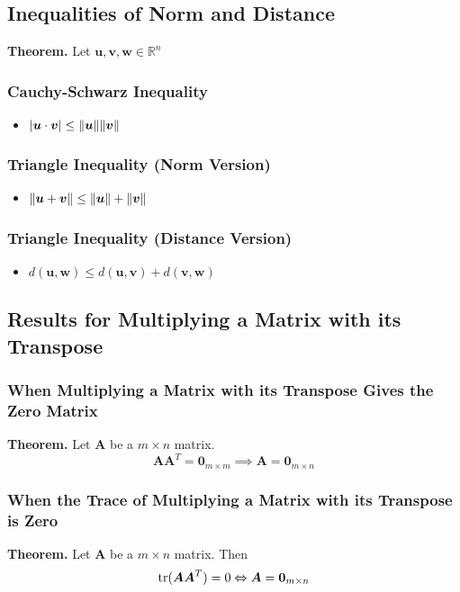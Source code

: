 \documentclass[../ma2001_notes.tex]{subfiles}
\begin{document}
\subsection{Inequalities of Norm and Distance}
\textbf{Theorem.} Let \(\bm{u},\bm{v},\bm{w}\in\mathbb{R}^n\)

\subsubsection{Cauchy-Schwarz Inequality}
\begin{itemize}
	\item\(\lvert\bm{u}\cdot\bm{v}\rvert\leq\lVert\bm{u}\rVert\lVert\bm{v}\rVert\)
\end{itemize}

\subsubsection{Triangle Inequality (Norm Version)}
\begin{itemize}
	\item\(\lVert\bm{u}+\bm{v}\rVert\leq\lVert\bm{u}\rVert+\lVert\bm{v}\rVert\)
\end{itemize}
\subsubsection{Triangle Inequality (Distance Version)}
\begin{itemize}
	\item\(d(\bm{u},\bm{w})\leq d(\bm{u},\bm{v})+d(\bm{v},\bm{w})\)
\end{itemize}

\subsection{Results for Multiplying a Matrix with its Transpose}
\subsubsection{When Multiplying a Matrix with its Transpose Gives the Zero Matrix}
\textbf{Theorem.} Let \(\bm{A}\) be a \(m\times n\) matrix.
\[\bm{AA}^T=\bm{0}_{m\times m}\implies\bm{A}=\bm{0}_{m\times n}\]

\subsubsection{When the Trace of Multiplying a Matrix with its Transpose is Zero}
\textbf{Theorem.} Let \(\bm{A}\) be a \(m\times n\) matrix. Then
\[\operatorname{tr}(\bm{AA}^T)=0\Leftrightarrow\bm{A}=\bm{0}_{m\times n}\]
\end{document}
